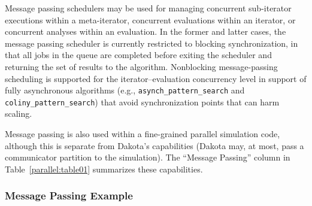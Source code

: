 
Message passing schedulers may be used for managing concurrent
sub-iterator executions within a meta-iterator, concurrent evaluations
within an iterator, or concurrent analyses within an evaluation.  In
the former and latter cases, the message passing scheduler is
currently restricted to blocking synchronization, in that all jobs in
the queue are completed before exiting the scheduler and returning the
set of results to the algorithm. Nonblocking message-passing
scheduling is supported for the iterator--evaluation concurrency level
in support of fully asynchronous algorithms (e.g.,
\texttt{asynch\_pattern\_search} and \texttt{coliny\_pattern\_search})
that avoid synchronization points that can harm scaling.

Message passing is also used within a fine-grained parallel simulation
code, although this is separate from Dakota's capabilities (Dakota
may, at most, pass a communicator partition to the simulation).  The
``Message Passing'' column in Table~\ref{parallel:table01} summarizes
these capabilities.

\subsubsection{Message Passing Example}\label{parallel:SLP:message:ex}

